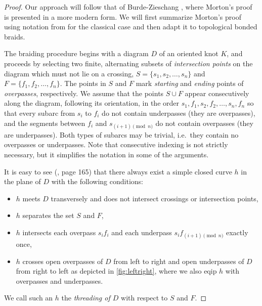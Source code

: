 \documentclass{article}
\theoremstyle{definition}
\theoremstyle{plain}
\theoremstyle{remark}
\begin{document}
\begin{proof}
Our approach will follow that of Burde-Zieschang \cite{burde2002knots}, where Morton’s proof \cite{morton1986threading} is presented in a more modern form. We will first summarize Morton's proof using notation from \cite{burde2002knots} for the classical case and then adapt it to topological bonded braids.

The braiding procedure begins with a diagram $D$ of an oriented knot $K$, and proceeds by selecting two finite, alternating subsets of \emph{intersection points} on the diagram which must not lie on a crossing, $S=\{s_1,s_2,\ldots,s_n\}$ and
$F=\{f_1,f_2,\ldots,f_n\}$. The points in $S$ and $F$ mark \emph{starting} and \emph{ending} points of \emph{overpasses}, respectively. 
We assume that the points $S \cup F$ appear consecutively along the diagram, following its orientation, in the order $s_1, f_1, s_2, f_2, \ldots, s_n, f_n$ so that every subarc from $s_i$ to $f_i$ do not contain underpasses (they are overpasses), and the segments between $f_i$ and $s_{(i+1) \pmod n}$ do not contain overpasses (they are underpasses). Both types of subarcs may be trivial, i.e.\ they contain no overpasses or underpasses.
Note that consecutive indexing is not strictly necessary, but it simplifies the notation in some of the arguments.

It is easy to see (\cite{burde2002knots}, page 165) that there always exist a simple closed curve $h$ in the plane of $D$ with the following conditions: 
\begin{itemize}
    \item $h$ meets $D$ transversely and does not intersect crossings or intersection points,
    \item $h$ separates the set $S$ and $F$,
    \item $h$ intersects each overpass $s_i f_i$ and each underpass $s_i f_{(i+1) \pmod n}$ exactly once,
    \item $h$ crosses open overpasses of $D$ from left to right and open underpasses of $D$ from right to left as depicted in \autoref{fig:leftright}, where we also eqip $h$ with overpasses and underpasses.
\end{itemize}
We call such an $h$ the \emph{threading of $D$} with respect to $S$ and $F$.


\end{proof}
\end{document}

